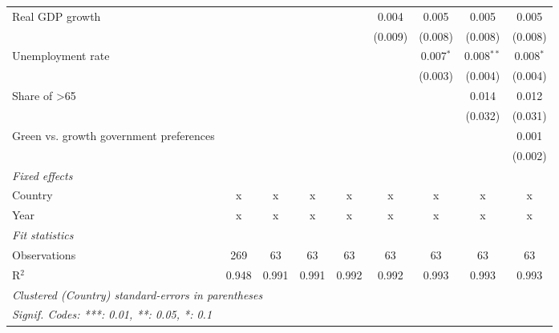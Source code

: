 \begin{table}[htbp]
\begin{tabular}{lcccccccc}
      Real GDP growth                                                  &              &               &         &             & 0.004       & 0.005       & 0.005        & 0.005\\   
                                                                       &              &               &         &             & (0.009)     & (0.008)     & (0.008)      & (0.008)\\   
      Unemployment rate                                                &              &               &         &             &             & 0.007$^{*}$ & 0.008$^{**}$ & 0.008$^{*}$\\   
                                                                       &              &               &         &             &             & (0.003)     & (0.004)      & (0.004)\\   
      Share of >65                                                     &              &               &         &             &             &             & 0.014        & 0.012\\   
                                                                       &              &               &         &             &             &             & (0.032)      & (0.031)\\   
      Green vs. growth government preferences                          &              &               &         &             &             &             &              & 0.001\\   
                                                                       &              &               &         &             &             &             &              & (0.002)\\   
      \emph{Fixed effects}\\
      Country                                                          & x            & x             & x       & x           & x           & x           & x            & x\\  
      Year                                                             & x            & x             & x       & x           & x           & x           & x            & x\\  
      \midrule \emph{Fit statistics}\\
      Observations                                                     & 269          & 63            & 63      & 63          & 63          & 63          & 63           & 63\\  
      R$^2$                                                            & 0.948        & 0.991         & 0.991   & 0.992       & 0.992       & 0.993       & 0.993        & 0.993\\  
      \midrule
      \multicolumn{9}{l}{\emph{Clustered (Country) standard-errors in parentheses}}\\
      \multicolumn{9}{l}{\emph{Signif. Codes: ***: 0.01, **: 0.05, *: 0.1}}\\
   \end{tabular}
\end{table}


